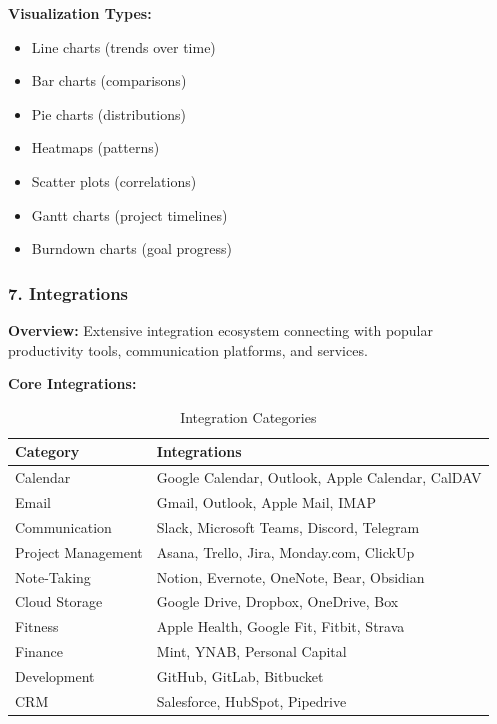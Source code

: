 \textbf{Visualization Types:}

\begin{itemize}
    \item Line charts (trends over time)
    \item Bar charts (comparisons)
    \item Pie charts (distributions)
    \item Heatmaps (patterns)
    \item Scatter plots (correlations)
    \item Gantt charts (project timelines)
    \item Burndown charts (goal progress)
\end{itemize}

\subsubsection{7. Integrations}

\textbf{Overview:}
Extensive integration ecosystem connecting \lifeos{} with popular productivity tools, communication platforms, and services.

\textbf{Core Integrations:}

\begin{table}[H]
\centering
\caption{Integration Categories}
\begin{tabular}{|l|p{10cm}|}
\hline
\rowcolor{lightgray}
\textbf{Category} & \textbf{Integrations} \\
\hline
Calendar & Google Calendar, Outlook, Apple Calendar, CalDAV \\
\hline
Email & Gmail, Outlook, Apple Mail, IMAP \\
\hline
Communication & Slack, Microsoft Teams, Discord, Telegram \\
\hline
Project Management & Asana, Trello, Jira, Monday.com, ClickUp \\
\hline
Note-Taking & Notion, Evernote, OneNote, Bear, Obsidian \\
\hline
Cloud Storage & Google Drive, Dropbox, OneDrive, Box \\
\hline
Fitness & Apple Health, Google Fit, Fitbit, Strava \\
\hline
Finance & Mint, YNAB, Personal Capital \\
\hline
Development & GitHub, GitLab, Bitbucket \\
\hline
CRM & Salesforce, HubSpot, Pipedrive \\
\hline
\end{tabular}
\end{table}

